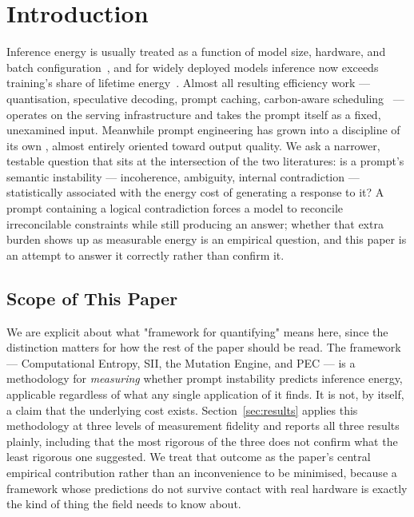\documentclass[conference]{IEEEtran}
\begin{document}
\section{Introduction}
Inference energy is usually treated as a function of model size,
hardware, and batch configuration~\cite{strubell2019energy,
patterson2022carbon,samsi2023words,desislavov2023trends}, and for
widely deployed models inference now exceeds training's share of
lifetime energy~\cite{wu2022sustainable,faiz2024llmcarbon}. Almost all
resulting efficiency work --- quantisation, speculative decoding,
prompt caching, carbon-aware scheduling~\cite{chien2023reducing,
dodge2022measuring} --- operates on the serving infrastructure and
takes the prompt itself as a fixed, unexamined input. Meanwhile prompt
engineering has grown into a discipline of its own
\cite{sahoo2024systematic}, almost entirely oriented toward output
quality. We ask a narrower, testable question that sits at the
intersection of the two literatures: is a prompt's semantic
instability --- incoherence, ambiguity, internal contradiction ---
statistically associated with the energy cost of generating a response
to it? A prompt containing a logical contradiction forces a model to
reconcile irreconcilable constraints while still producing an answer;
whether that extra burden shows up as measurable energy is an
empirical question, and this paper is an attempt to answer it
correctly rather than confirm it.
\subsection{Scope of This Paper}
\label{sec:scope}
We are explicit about what "framework for quantifying" means here,
since the distinction matters for how the rest of the paper should be
read. The framework --- Computational Entropy, SII, the Mutation
Engine, and PEC --- is a methodology for \emph{measuring} whether
prompt instability predicts inference energy, applicable regardless of
what any single application of it finds. It is not, by itself, a claim
that the underlying cost exists. Section~\ref{sec:results} applies
this methodology at three levels of measurement fidelity and reports
all three results plainly, including that the most rigorous of the
three does not confirm what the least rigorous one suggested. We treat
that outcome as the paper's central empirical contribution rather than
an inconvenience to be minimised, because a framework whose
predictions do not survive contact with real hardware is exactly the
kind of thing the field needs to know about.
\end{document}
